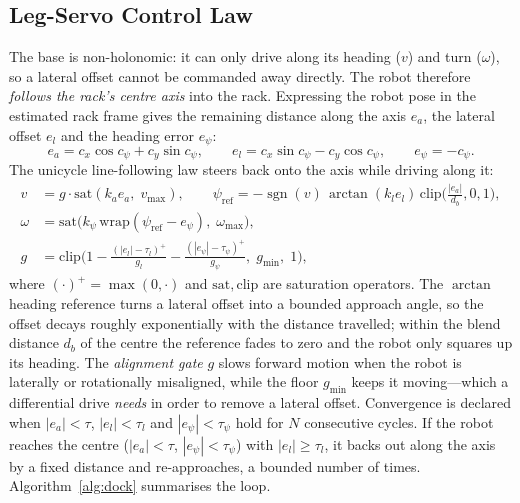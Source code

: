 \documentclass[11pt,a4paper]{article}
\begin{document}
\subsection{Leg-Servo Control Law}\label{sec:control}
The base is non-holonomic: it can only drive along its heading ($v$) and turn
($\omega$), so a lateral offset cannot be commanded away directly. The robot
therefore \emph{follows the rack's centre axis} into the rack. Expressing the
robot pose in the estimated rack frame gives the remaining distance along the
axis $e_a$, the lateral offset $e_l$ and the heading error $e_\psi$:
\begin{equation}
e_a = c_x\cos c_\psi + c_y\sin c_\psi,\qquad
e_l = c_x\sin c_\psi - c_y\cos c_\psi,\qquad
e_\psi = -c_\psi .
\end{equation}
The unicycle line-following law steers back onto the axis while driving along
it:
\begin{align}
v &= g\cdot \mathrm{sat}(k_a e_a,\;v_{\max}),\qquad
\psi_\text{ref} = -\operatorname{sgn}(v)\,\arctan(k_l e_l)\,
  \mathrm{clip}\!\Big(\tfrac{|e_a|}{d_b},0,1\Big),\\[2pt]
\omega &= \mathrm{sat}\big(k_\psi\,\mathrm{wrap}(\psi_\text{ref}-e_\psi),\;\omega_{\max}\big),\\[2pt]
g &= \mathrm{clip}\!\Big(1-\tfrac{(|e_l|-\tau_l)^+}{g_l}-\tfrac{(|e_\psi|-\tau_\psi)^+}{g_\psi},\;
 g_{\min},\;1\Big),
\end{align}
where $(\cdot)^+=\max(0,\cdot)$ and $\mathrm{sat},\mathrm{clip}$ are
saturation operators. The $\arctan$ heading reference turns a lateral offset
into a bounded approach angle, so the offset decays roughly exponentially
with the distance travelled; within the blend distance $d_b$ of the centre
the reference fades to zero and the robot only squares up its heading. The
\emph{alignment gate} $g$ slows forward motion when the robot is laterally or
rotationally misaligned, while the floor $g_{\min}$ keeps it moving---which a
differential drive \emph{needs} in order to remove a lateral offset.
Convergence is declared when $|e_a|<\tau$, $|e_l|<\tau_l$ and
$|e_\psi|<\tau_\psi$ hold for $N$ consecutive cycles. If the robot reaches the
centre ($|e_a|<\tau$, $|e_\psi|<\tau_\psi$) with $|e_l|\ge\tau_l$, it backs out
along the axis by a fixed distance and re-approaches, a bounded number of
times. Algorithm~\ref{alg:dock} summarises the loop.
\end{document}
